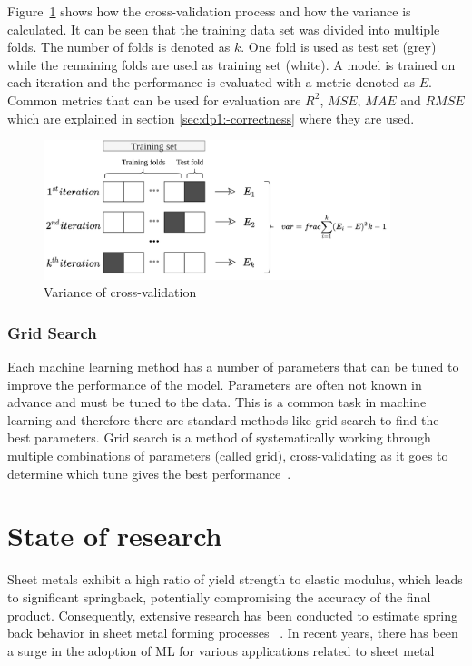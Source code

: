 Figure~\ref{fig:cross-validation} shows how the cross-validation process and how the variance
is calculated.
It can be seen that the training data set was divided into multiple folds.
The number of folds is denoted as $k$.
One fold is used as test set (grey) while the remaining folds are used as training set (white).
A model is trained on each iteration and the performance is evaluated with a metric denoted as $E$.
Common metrics that can be used for evaluation are $R^2$, $MSE$, $MAE$ and $RMSE$ which are explained in section
\ref{sec:dp1:-correctness} where they are used.

\begin{figure}[h]
    \begin{tcolorbox}[arc=0pt,boxrule=0.5pt]
        \centering
        \includegraphics[trim=left botm right top, width=0.9\textwidth]
        {chap2/images/cross_validation}
        \caption{Variance of cross-validation}
        \label{fig:cross-validation}
    \end{tcolorbox}
\end{figure}

\subsubsection{Grid Search}\label{subsubsec:grid-search}
Each machine learning method has a number of parameters that can be tuned to improve the
performance of the model.
Parameters are often not known in advance and must be tuned to the data.
This is a common task in machine learning and therefore there are standard methods like
grid search to find the best parameters.
Grid search is a method of systematically working through multiple combinations of
parameters (called grid), cross-validating as it goes to determine which tune gives the best
performance~\cite[p. 260--275]{muller_introductionmachinelearning_2016}.


\section{State of research}\label{sec:state-of-research}
Sheet metals exhibit a high ratio of yield strength to elastic modulus, which leads to significant springback,
potentially compromising the accuracy of the final product.
Consequently, extensive research has been conducted to estimate spring back behavior in sheet metal forming
processes ~\cite[p. 565]{liu2021deep}.
In recent years, there has been a surge in the adoption of \ac{ML} for various applications related to sheet metal


